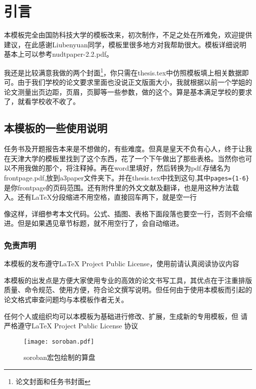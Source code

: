 \chapter{引言}

本模板完全由国防科技大学的模板改来，初次制作，不足之处在所难免，欢迎提供建议，在此感谢Liubenyuan同学，模板里很多地方对我帮助很大。模板详细说明基本上可以参考nudtpaper-2.2.pdf。

我还是比较满意我做的两个封面\footnote{论文封面和任务书封面}，你只需在thesis.tex中仿照模板填上相关数据即可。由于我们学校的论文要求里面也没说正文版面大小，我就根据以前一个学姐的论文测量出页边距，页眉，页脚等一些参数，做的这个。算是基本满足学校的要求了，就看学校收不收了。
\section{本模板的一些使用说明}
任务书及开题报告本来是不想做的，有些难度。但真是皇天不负有心人，终于让我在天津大学的模板里找到了这个东西，花了一个下午做出了那些表格。当然你也可以不用我做的那个，将\verb||注释掉。再在word里填好，然后转换为pdf,存储名为frontpage.pdf,放到a3paper文件夹下。并在thesis.tex中找到这句\verb||,其中\verb|pages={1-6}|是你frontpage的页码范围。还有附件里的外文文献及翻译，也是用这种方法载入。还有\LaTeX{}分段缩进不用空格，直接回车两下，就是空一行

像这样，详细参考本文代码。公式、插图、表格下面段落也要空一行，否则不会缩进。但是如果遇见章节标题，就不用空行了，会自动缩进。
\subsection{免责声明}
\begin{myList}
\item 本模板的发布遵守\LaTeX{} Project Public License，使用前请认真阅读协议内容
\item 本模板的出发点是方便大家使用专业的高效的论文书写工具，其优点在于注重排版质量、命令规范、使用方便，符合论文撰写说明。但任何由于使用本模板而引起的论文格式审查问题均与本模板作者无关。
\item 任何个人或组织均可以本模板为基础进行修改、扩展，生成新的专用模板，但
请严格遵守\LaTeX{} Project Public License 协议
\end{myList}
\begin{figure}[htp]
\centering
\texttt{[image: soroban.pdf]}
\caption{soroban宏包绘制的算盘}
\end{figure}

